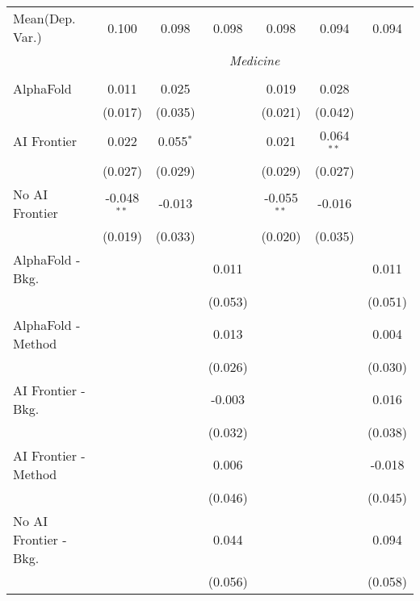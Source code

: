 \begin{tabular}{lcccccc}
Mean(Dep. Var.) & 0.100 & 0.098 & 0.098 & 0.098 & 0.094 & 0.094 \\
 & \multicolumn{6}{c}{\textit{Medicine}} \\ \\
   AlphaFold               & 0.011         & 0.025       &         & 0.019         & 0.028        &   \\   
                           & (0.017)       & (0.035)     &         & (0.021)       & (0.042)      &   \\   
   AI Frontier             & 0.022         & 0.055$^{*}$ &         & 0.021         & 0.064$^{**}$ &   \\   
                           & (0.027)       & (0.029)     &         & (0.029)       & (0.027)      &   \\   
   No AI Frontier          & -0.048$^{**}$ & -0.013      &         & -0.055$^{**}$ & -0.016       &   \\   
                           & (0.019)       & (0.033)     &         & (0.020)       & (0.035)      &   \\   
   AlphaFold - Bkg.        &               &             & 0.011   &               &              & 0.011\\   
                           &               &             & (0.053) &               &              & (0.051)\\   
   AlphaFold - Method      &               &             & 0.013   &               &              & 0.004\\   
                           &               &             & (0.026) &               &              & (0.030)\\   
   AI Frontier - Bkg.      &               &             & -0.003  &               &              & 0.016\\   
                           &               &             & (0.032) &               &              & (0.038)\\   
   AI Frontier - Method    &               &             & 0.006   &               &              & -0.018\\   
                           &               &             & (0.046) &               &              & (0.045)\\   
   No AI Frontier - Bkg.   &               &             & 0.044   &               &              & 0.094\\   
                           &               &             & (0.056) &               &              & (0.058)\\   

\end{tabular}
